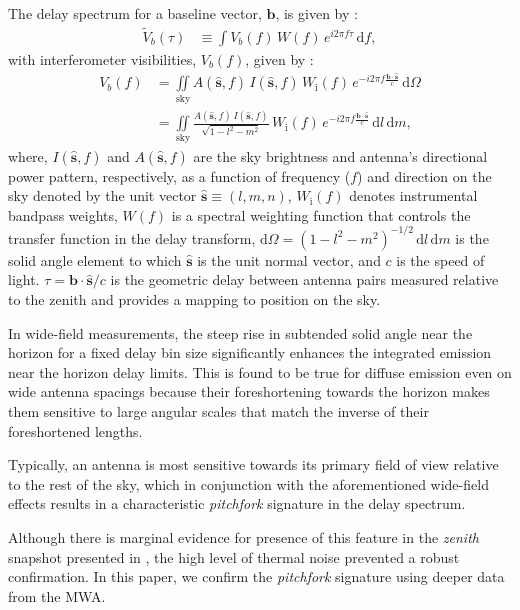 \documentclass[preprint2,apjl,numberedappendix,twocolappendix,appendixfloats]{emulateapj}
\newcommand{\dif}{\mathrm{d}}
\begin{document}
The delay spectrum for a baseline vector, $\boldsymbol{b}$, is given by \citep{par12a,par12b,thy13,thy15}: 
\begin{align}
  \tilde{V}_b(\tau) &\equiv \int V_b(f)\,W(f)\,e^{i2\pi f\tau}\,\dif f,
\end{align}
with interferometer visibilities, $V_b(f)$, given by \citep{van34,zer38,tho01}:
\begin{align} 
  V_b(f) &= \iint\limits_\textrm{sky} A(\hat{\boldsymbol{s}},f)\,I(\hat{\boldsymbol{s}},f)\,W_\textrm{i}(f)\,e^{-i2\pi f\frac{\boldsymbol{b}\cdot\hat{\boldsymbol{s}}}{c}}\,\dif\Omega \\
         &= \iint\limits_\textrm{sky} \frac{A(\hat{\boldsymbol{s}},f)\,I(\hat{\boldsymbol{s}},f)}{\sqrt{1-l^2-m^2}}\,W_\textrm{i}(f)\,e^{-i2\pi f\frac{\boldsymbol{b}\cdot\hat{\boldsymbol{s}}}{c}}\,\dif l\,\dif m, 
\end{align}
where, $I(\hat{\boldsymbol{s}},f)$ and $A(\hat{\boldsymbol{s}},f)$ are the sky brightness and antenna's directional power pattern, respectively, as a function of frequency ($f$) and direction on the sky denoted by the unit vector $\hat{\boldsymbol{s}}\equiv (l,m,n)$, $W_\textrm{i}(f)$ denotes instrumental bandpass weights, $W(f)$ is a spectral weighting function that controls the transfer function in the delay transform, $\dif\Omega=(1-l^2-m^2)^{-1/2}\,\dif l\,\dif m$ is the solid angle element to which $\hat{\boldsymbol{s}}$ is the unit normal vector, and $c$ is the speed of light. $\tau=\boldsymbol{b}\cdot\hat{\boldsymbol{s}}/c$ is the geometric delay between antenna pairs measured relative to the zenith and provides a mapping to position on the sky.

In wide-field measurements, the steep rise in subtended solid angle near the horizon for a fixed delay bin size significantly enhances the integrated emission near the horizon delay limits. This is found to be true for diffuse emission even on wide antenna spacings because their foreshortening towards the horizon makes them sensitive to large angular scales that match the inverse of their foreshortened lengths. 

Typically, an antenna is most sensitive towards its primary field of view relative to the rest of the sky, which in conjunction with the aforementioned wide-field effects results in a characteristic {\it pitchfork} signature in the delay spectrum. 

Although there is marginal evidence for presence of this feature in the {\it zenith} snapshot presented in \citet{thy15}, the high level of thermal noise prevented a robust confirmation. In this paper, we confirm the {\it pitchfork} signature using deeper data from the MWA.
\end{document}
